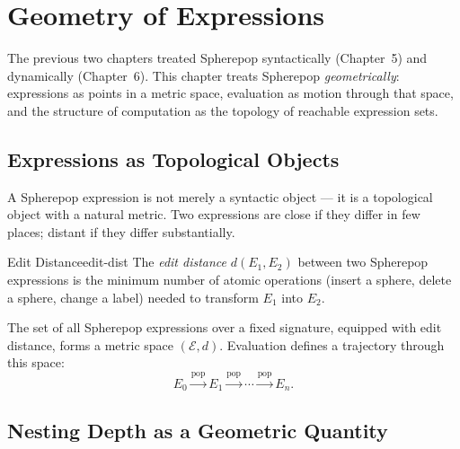
\chapter{Geometry of Expressions}



The previous two chapters treated Spherepop syntactically (Chapter~5)
and dynamically (Chapter~6). This chapter treats Spherepop
\emph{geometrically}: expressions as points in a metric space, evaluation
as motion through that space, and the structure of computation as the
topology of reachable expression sets.

\section{Expressions as Topological Objects}

A Spherepop expression is not merely a syntactic object — it is a
topological object with a natural metric. Two expressions are close
if they differ in few places; distant if they differ substantially.

\begin{definition}{Edit Distance}{edit-dist}
  The \emph{edit distance} $d(E_1, E_2)$ between two Spherepop
  expressions is the minimum number of atomic operations (insert a
  sphere, delete a sphere, change a label) needed to transform
  $E_1$ into $E_2$.
\end{definition}

The set of all Spherepop expressions over a fixed signature, equipped
with edit distance, forms a metric space $(\mathcal{E}, d)$. Evaluation
defines a trajectory through this space:
\[
  E_0 \xrightarrow{\text{pop}} E_1 \xrightarrow{\text{pop}} \cdots
  \xrightarrow{\text{pop}} E_n.
\]

\section{Nesting Depth as a Geometric Quantity}


